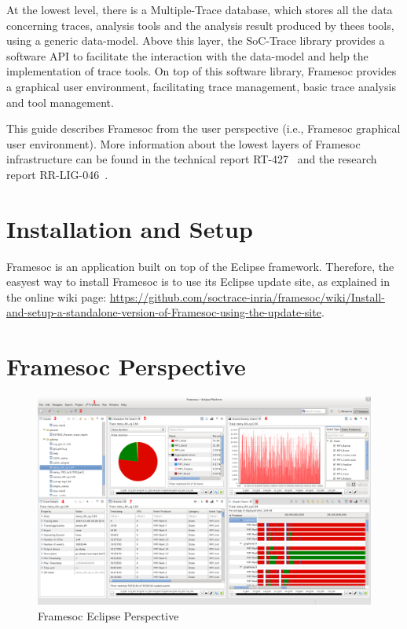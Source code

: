 \documentclass[twoside]{article}
\begin{document}
\begin{sloppypar}
At the lowest level, there is a Multiple-Trace database, which stores all the data concerning traces, analysis tools and the analysis result produced by thees tools, using a generic data-model.
Above this layer, the SoC-Trace library provides a software API to facilitate the interaction with the data-model and help the implementation of trace tools.
On top of this software library, Framesoc provides a graphical user environment, facilitating trace management, basic trace analysis and tool management.

This guide describes Framesoc from the user perspective (i.e., Framesoc graphical user environment). 
More information about the lowest layers of Framesoc infrastructure can be found in the technical report RT-427~\cite{pagano:hal} and the research report RR-LIG-046~\cite{rrlig46}.

\newpage

\section{Installation and Setup}
\label{sec:installation}

Framesoc is an application built on top of the Eclipse framework. Therefore, the easyest way to install Framesoc is to use its Eclipse update site, as explained in the online wiki page: \url{https://github.com/soctrace-inria/framesoc/wiki/Install-and-setup-a-standalone-version-of-Framesoc-using-the-update-site}.

\section{Framesoc Perspective}
\label{sec:perspective}

\begin{figure}[h!]
  \centering
    \includegraphics[width=1.0\textwidth]{images/perspective_numbers.png}
  \caption{Framesoc Eclipse Perspective}
  \label{fig:all_perspective}
\end{figure}


\end{sloppypar}
\end{document}
